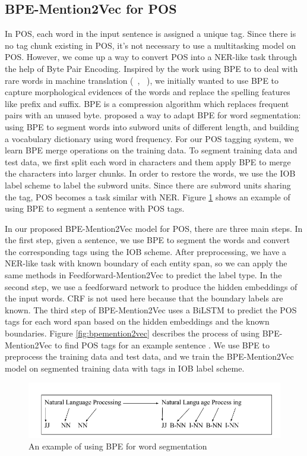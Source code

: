 \documentclass{sfuthesis}
\begin{document}
\subsection{BPE-Mention2Vec for POS}
In POS, each word in the input sentence is assigned a unique tag. Since there is no tag chunk existing in POS, it's not necessary to use a multitasking model on POS. However, we come up a way to convert POS into a NER-like task through the help of Byte Pair Encoding. Inspired by the work using BPE to to deal with rare words in machine translation (~\citeauthor{sennrich2015neural}, ~\citeyear{sennrich2015neural}), we initially wanted to use BPE to capture morphological evidences of the words and replace the spelling features like prefix and suffix. BPE is a compression algorithm which replaces frequent pairs with an unused byte. \cite{sennrich2015neural} proposed a way to adapt BPE for word segmentation: using BPE to segment words into subword units of different length, and building a vocabulary dictionary using word frequency. For our POS tagging system, we learn BPE merge operations on the training data. To segment training data and test data, we first split each word in characters and them apply BPE to merge the characters into larger chunks. In order to restore the words, we use the IOB label scheme to label the subword units. Since there are subword units sharing the tag, POS becomes a task similar with NER. Figure \ref{fig:bpe} shows an example of using BPE to segment a sentence with POS tags. 

In our proposed BPE-Mention2Vec model for POS, there are three main steps. In the first step, given a sentence, we use BPE to segment the words and convert the corresponding tags using the IOB scheme. After preprocessing, we have a NER-like task with known boundary of each entity span, so we can apply the same methods in Feedforward-Mention2Vec to predict the label type. In the second step, we use a feedforward network to produce the hidden embeddings of the input words. CRF is not used here because that the boundary labels are known. The third step of BPE-Mention2Vec uses a BiLSTM to predict the POS tags for each word span based on the hidden embeddings and the known boundaries. Figure \ref{fig:bpemention2vec} describes the process of using BPE-Mention2Vec to find POS tags for an example sentence . 
We use BPE to preprocess the training data and test data, and we train the BPE-Mention2Vec model on segmented training data with tags in IOB label scheme. 

\begin{figure}
  \centering
  \includegraphics[scale=0.5]{bpe.png}
 \caption{An example of using BPE for word segmentation}
  \label{fig:bpe}
\end{figure}
\end{document}
